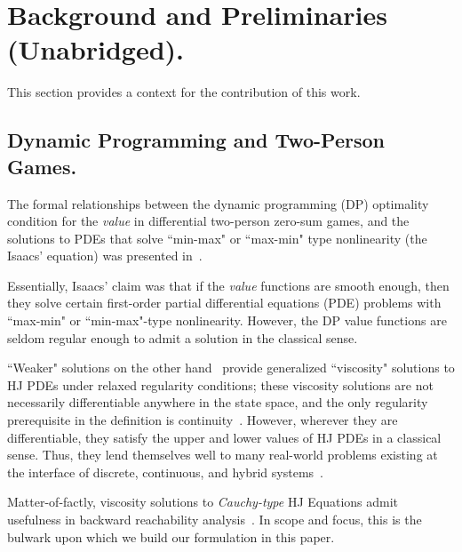 \section{Background and Preliminaries (Unabridged).}
\label{app:back_unabridged}

\setcounter{appidx}{1}
\renewcommand\theequation{\Alph{appidx}.\arabic{equation}}

\setcounter{equation}{0}

This section provides a context for the contribution of this work.

\subsection{Dynamic Programming and Two-Person Games.}

\noindent The formal relationships between the dynamic programming (DP) optimality condition for the \textit{value} in differential two-person zero-sum games, and the solutions to PDEs that solve ``min-max" or ``max-min" type nonlinearity (the Isaacs' equation) was presented in~\citet{Isaacs1965}. 

Essentially, Isaacs' claim was that if the \textit{value} functions are smooth enough, then they solve certain first-order partial differential equations (PDE) problems with  ``max-min" or ``min-max"-type nonlinearity.  However, the DP value functions are seldom regular enough to admit a solution in the classical sense.  

``Weaker" solutions on the other hand~\citet{Lions1982, Evans1984, Crandall1984, CrandallLaxFriedrichs, Souganidis} provide generalized ``viscosity" solutions to HJ PDEs under relaxed regularity conditions; these viscosity solutions are not necessarily differentiable anywhere in the state space, and the only regularity prerequisite in the definition is continuity~\citet{Crandall1983viscosity}. However, wherever they are differentiable, they satisfy the  upper and lower values of HJ PDEs in a classical sense. Thus, they lend themselves well to many real-world problems existing at the interface of discrete, continuous, and hybrid systems~\citet{LygerosReachability, OsherFronts, Mitchell2020, Souganidis, Mitchell2005}. 

Matter-of-factly, viscosity solutions to \textit{Cauchy-type} HJ Equations admit usefulness in backward reachability analysis~\citet{Mitchell2005}. In scope and focus, this is the bulwark upon which we build our formulation in this paper.

